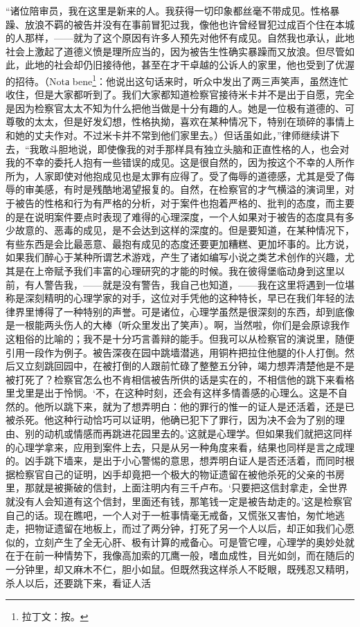 \par “诸位陪审员，我在这里是新来的人。我获得一切印象都丝毫不带成见。性格暴躁、放浪不羁的被告并没有在事前冒犯过我，像他也许曾经冒犯过成百个住在本城的人那样，——就为了这个原因有许多人预先对他怀有成见。自然我也承认，此地社会上激起了道德义愤是理所应当的，因为被告生性确实暴躁而又放浪。但尽管如此，此地的社会却仍旧接待他，甚至在才干卓越的公诉人的家里，他也受到了优渥的招待。（Notа bene\footnote{拉丁文：按。}：他说出这句话来时，听众中发出了两三声笑声，虽然连忙收住，但是大家都听到了。我们大家都知道检察官接待米卡并不是出于自愿，完全是因为检察官太太不知为什么把他当做是十分有趣的人。她是一位极有道德的、可尊敬的太太，但是好发幻想，性格执拗，喜欢在某种情况下，特别在琐碎的事情上和她的丈夫作对。不过米卡并不常到他们家里去。）但话虽如此，”律师继续讲下去，“我敢斗胆地说，即使像我的对手那样具有独立头脑和正直性格的人，也会对我的不幸的委托人抱有一些错误的成见。这是很自然的，因为按这个不幸的人所作所为，人家即使对他抱成见也是太罪有应得了。受了侮辱的道德感，尤其是受了侮辱的审美感，有时是残酷地渴望报复的。自然，在检察官的才气横溢的演词里，对于被告的性格和行为有严格的分析，对于案件也抱着严格的、批判的态度，而主要的是在说明案件要点时表现了难得的心理深度，一个人如果对于被告的态度具有多少故意的、恶毒的成见，是不会达到这样的深度的。但是要知道，在某种情况下，有些东西是会比最恶意、最抱有成见的态度还要更加糟糕、更加坏事的。比方说，如果我们醉心于某种所谓艺术游戏，产生了诸如编写小说之类艺术创作的兴趣，尤其是在上帝赋予我们丰富的心理研究的才能的时候。我在彼得堡临动身到这里以前，有人警告我，——就是没有警告，我自己也知道，——我在这里将遇到一位堪称是深刻精明的心理学家的对手，这位对手凭他的这种特长，早已在我们年轻的法律界里博得了一种特别的声誉。可是诸位，心理学虽然是很深刻的东西，却到底像是一根能两头伤人的大棒（听众里发出了笑声）。啊，当然啦，你们是会原谅我作这粗俗的比喻的；我不是十分巧言善辩的能手。但我可以从检察官的演说里，随便引用一段作为例子。被告深夜在园中跳墙潜逃，用铜杵把拉住他腿的仆人打倒。然后又立刻跳回园中，在被打倒的人跟前忙碌了整整五分钟，竭力想弄清楚他是不是被打死了？检察官怎么也不肯相信被告所供的话是实在的，不相信他的跳下来看格里戈里是出于怜悯。‘不，在这种时刻，还会有这样多情善感的心理么。这是不自然的。他所以跳下来，就为了想弄明白：他的罪行的惟一的证人是还活着，还是已被杀死。他这种行动恰巧可以证明，他确已犯下了罪行，因为决不会为了别的理由、别的动机或情感而再跳进花园里去的。’这就是心理学。但如果我们就把这同样的心理学拿来，应用到案件上去，只是从另一种角度来看，结果也同样是言之成理的。凶手跳下墙来，是出于小心警惕的意思，想弄明白证人是否还活着，而同时根据检察官自己的证明，凶手却竟把一个极大的物证遗留在被他杀死的父亲的书房里，那就是被撕破的信封，上面注明内有三千卢布。‘只要把这信封拿走，全世界就没有人会知道有这个信封，里面还有钱，那笔钱一定是被告劫走的。’这是检察官自己的话。现在瞧吧，一个人对于一桩事情毫无戒备，又慌张又害怕，匆忙地逃走，把物证遗留在地板上，而过了两分钟，打死了另一个人以后，却正如我们心愿似的，立刻产生了全无心肝、极有计算的戒备心。可是管它哩，心理学的奥妙处就在于在前一种情势下，我像高加索的兀鹰一般，嗜血成性，目光如剑，而在随后的一分钟里，却又麻木不仁，胆小如鼠。但既然我这样杀人不眨眼，既残忍又精明，杀人以后，还要跳下来，看证人活